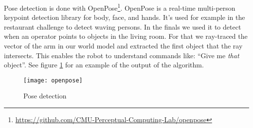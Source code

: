 Pose detection is done with OpenPose\footnote{\url{https://github.com/CMU-Perceptual-Computing-Lab/openpose}}.
OpenPose is a real-time multi-person keypoint detection library for body, face, and hands.
It's used for example in the restaurant challenge to detect waving persons.
In the finals we used it to detect when an operator points to objects in the living room.
For that we ray-traced the vector of the arm in our world model and extracted the first object that the ray intersects.
This enables the robot to understand commands like: ``Give me \emph{that} object''.
See figure \ref{fig:pose_detection} for an example of the output of the algorithm.

\begin{figure}[H]
	\centering
	\texttt{[image: openpose]}
	\caption{Pose detection}
	\label{fig:pose_detection}
\end{figure}
